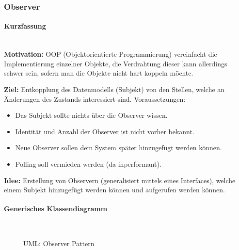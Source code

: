 \documentclass[
    ngerman,
    color=3b,
    summary,
    boxarc,
    main,
]{rubos-tuda-template}
\begin{document}
\subsubsection{Observer}
\paragraph{Kurzfassung}\mbox{}\\
\textbf{Motivation:} OOP (Objektorientierte Programmierung) vereinfacht die Implementierung einzelner Objekte, die Verdrahtung dieser kann allerdings schwer sein, sofern man die Objekte nicht hart koppeln möchte.

\textbf{Ziel:} Entkopplung des Datenmodells (Subjekt) von den Stellen, welche an Änderungen des Zustands interessiert sind. Voraussetzungen:
\begin{itemize}
    \item Das Subjekt sollte nichts über die Observer wissen.
    \item Identität und Anzahl der Observer ist nicht vorher bekannt.
    \item Neue Observer sollen dem System später hinzugefügt werden können.
    \item Polling soll vermieden werden (da inperformant).
\end{itemize}

\textbf{Idee:} Erstellung von Observern (generalisiert mittels eines Interfaces), welche einem Subjekt hinzugefügt werden können und aufgerufen werden können.

\paragraph{Generisches Klassendiagramm}\mbox{}\\
\begin{figure}[ht]
    \centering
    \caption{UML: Observer Pattern}
\end{figure}
\end{document}
